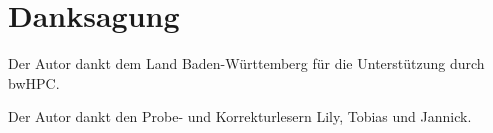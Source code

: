 \chapter*{Danksagung}


Der Autor dankt dem Land Baden-Württemberg für die Unterstützung durch bwHPC.

Der Autor dankt den Probe- und Korrekturlesern Lily, Tobias und Jannick.